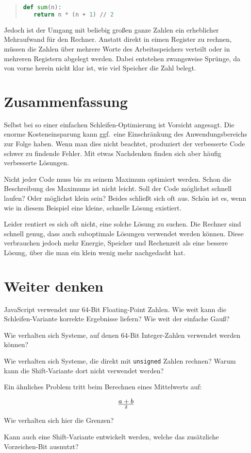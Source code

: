 \documentclass[a5paper,landscape,ngerman,10pt]{article}
\begin{document}
\begin{quotation}
\begin{lstlisting}[language=Python]
def sum(n):
   return n * (n + 1) // 2
\end{lstlisting}
\end{quotation}

Jedoch ist der Umgang mit beliebig großen ganze Zahlen
ein erheblicher Mehraufwand für den Rechner.
Anstatt direkt in eimen Register zu rechnen, müssen die
Zahlen über mehrere Worte des Arbeitsspeichers verteilt
oder in mehreren Registern abgelegt werden.
Dabei entstehen zwangsweise Sprünge, da von vorne herein
nicht klar ist, wie viel Speicher die Zahl belegt.

\section{Zusammenfassung}

Selbst bei so einer einfachen Schleifen-Optimierung ist
Vorsicht angesagt.
Die enorme Kosteneinsparung kann ggf.\ eine Einschränkung
des Anwendungsbereichs zur Folge haben.
Wenn man dies nicht beachtet, produziert der verbesserte
Code schwer zu findende Fehler.
Mit etwas Nachdenken finden sich aber häufig verbesserte
Lösungen.

Nicht jeder Code muss bis zu seinem Maximum optimiert
werden.
Schon die Beschreibung des Maximums ist nicht leicht.
Soll der Code möglichst schnell laufen?
Oder möglichst klein sein?
Beides schließt sich oft aus.
Schön ist es, wenn wie in diesem Beispiel eine kleine,
schnelle Lösung existiert.

Leider rentiert es sich oft nicht, eine solche Lösung
zu suchen.
Die Rechner sind schnell genug, dass auch suboptimale
Lösungen verwendet werden können.
Diese verbrauchen jedoch mehr Energie, Speicher und
Rechenzeit als eine bessere Lösung, über die man ein
klein wenig mehr nachgedacht hat.

\section{Weiter denken}

JavaScript verwendet nur $64$-Bit Floating-Point Zahlen.
Wie weit kann die Schleifen-Variante korrekte Ergebnisse
liefern? Wie weit der einfache Gauß?

Wie verhalten sich Systeme, auf denen $64$-Bit Integer-Zahlen
verwendet werden können?

Wie verhalten sich Systeme, die direkt mit
\lstinline!unsigned! Zahlen rechnen?
Warum kann die Shift-Variante dort nicht verwendet werden?

Ein ähnliches Problem tritt beim Berechnen eines Mittelwerts
auf:

\[a+b\over2\]

Wie verhalten sich hier die Grenzen?

Kann auch eine Shift-Variante entwickelt werden, welche
das zusätzliche Vorzeichen-Bit ausnutzt?
\end{document}
